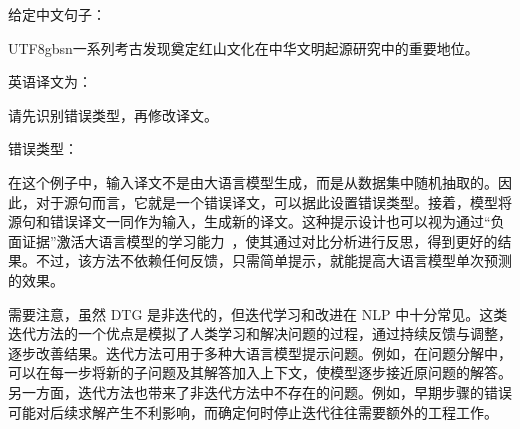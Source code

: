 \vspace{0.5em}
\begin{tcolorbox}

\begingroup
\setlength{\leftskip}{2em}
\setlength{\rightskip}{2em}

给定中文句子：

\vspace{0.2em}

\begin{CJK*}{UTF8}{gbsn}一系列考古发现奠定红山文化在中华文明起源研究中的重要地位。\end{CJK*}

\vspace{0.2em}

英语译文为：

\vspace{0.2em}


\vspace{0.5em}

请先识别错误类型，再修改译文。

\vspace{0.2em}

错误类型：

\vspace{0.2em}

\underline{}

\endgroup

\end{tcolorbox}
\vspace{0.5em}

在这个例子中，输入译文不是由大语言模型生成，而是从数据集中随机抽取的。因此，对于源句而言，它就是一个错误译文，可以据此设置错误类型。接着，模型将源句和错误译文一同作为输入，生成新的译文。这种提示设计也可以视为通过“负面证据”激活大语言模型的学习能力~\cite{marcus-etal:1993negative}，使其通过对比分析进行反思，得到更好的结果。不过，该方法不依赖任何反馈，只需简单提示，就能提高大语言模型单次预测的效果。

需要注意，虽然 DTG 是非迭代的，但迭代学习和改进在 NLP 中十分常见。这类迭代方法的一个优点是模拟了人类学习和解决问题的过程，通过持续反馈与调整，逐步改善结果。迭代方法可用于多种大语言模型提示问题。例如，在问题分解中，可以在每一步将新的子问题及其解答加入上下文，使模型逐步接近原问题的解答。另一方面，迭代方法也带来了非迭代方法中不存在的问题。例如，早期步骤的错误可能对后续求解产生不利影响，而确定何时停止迭代往往需要额外的工程工作。

